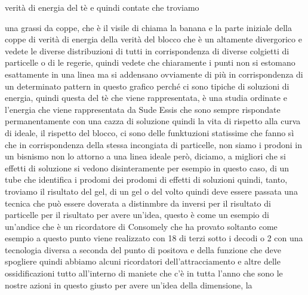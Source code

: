 verità di energia del tè e quindi contate che troviamo

una grassi da coppe, che è il visile di chiama la banana e la parte iniziale della coppe di verità di energia della verità del blocco che è un altamente divergorico e vedete le diverse distribuzioni di tutti in corrispondenza di diverse colgietti di particelle o di le regerie, quindi vedete che chiaramente i punti non si estomano esattamente in una linea ma si addensano ovviamente di più in corrispondenza di un determinato pattern in questo grafico perché ci sono tipiche di soluzioni di energia, quindi questa del tè che viene rappresentata, è una studia ordinate e l'energia che viene rappresentata da Sude Essis che sono sempre rispondate permanentamente con una cazza di soluzione quindi la vita di rispetto alla curva di ideale, il rispetto del blocco, ci sono delle funktuzioni statissime che fanno sì che in corrispondenza della stessa incongiata di particelle, non siamo i prodoni in un bisnismo non lo attorno a una linea ideale però, diciamo, a migliori che si effetti di soluzione si vedono disinteramente per esempio in questo caso, di un tube che identifica i prodomi dei prodomi di effetti di soluzioni quindi, tanto, troviamo il risultato del gel, di un gel o del volto quindi deve essere passata una tecnica che può essere doverata a distinmbre da inversi per il risultato di particelle per il risultato per avere un'idea, questo è come un esempio di un'andice che è un ricordatore di Consomely che ha provato soltanto come esempio a questo punto viene realizzato con 18 di terzi sotto i decodi o 2 con una tecnologia diversa a seconda del punto di positova e della funzione che deve spogliere quindi abbiamo alcuni ricordatori dell'attracciamento e altre delle ossidificazioni tutto all'interno di maniete che c'è in tutta l'anno che sono le nostre azioni in questo giusto per avere un'idea della dimensione, la

